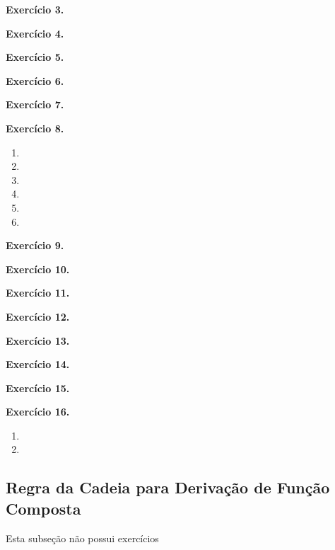 \documentclass[12pt,a4paper]{article}
\begin{document}
\vspace{0.5cm}
\noindent\textbf{Exercício 3.}

\vspace{0.5cm}
\noindent\textbf{Exercício 4.}

\vspace{0.5cm}
\noindent\textbf{Exercício 5.}

\vspace{0.5cm}
\noindent\textbf{Exercício 6.}

\vspace{0.5cm}
\noindent\textbf{Exercício 7.}

\vspace{0.5cm}
\noindent\textbf{Exercício 8.}
\begin{enumerate}
    \renewcommand{\theenumi}{\alph{enumi}}
    \renewcommand{\labelenumi}{\theenumi)}
    \item 
    \item 
    \item 
    \item 
    \item 
    \item 
\end{enumerate}

\vspace{0.5cm}
\noindent\textbf{Exercício 9.}

\vspace{0.5cm}
\noindent\textbf{Exercício 10.}

\vspace{0.5cm}
\noindent\textbf{Exercício 11.}

\vspace{0.5cm}
\noindent\textbf{Exercício 12.}

\vspace{0.5cm}
\noindent\textbf{Exercício 13.}

\vspace{0.5cm}
\noindent\textbf{Exercício 14.}

\vspace{0.5cm}
\noindent\textbf{Exercício 15.}

\vspace{0.5cm}
\noindent\textbf{Exercício 16.}
\begin{enumerate}
    \renewcommand{\theenumi}{\alph{enumi}}
    \renewcommand{\labelenumi}{\theenumi)}
    \item 
    \item 
\end{enumerate}

\subsection{Regra da Cadeia para Derivação de Função Composta}
Esta subseção não possui exercícios
\end{document}
